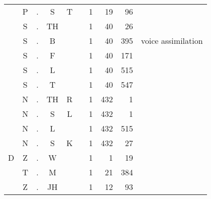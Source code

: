 \begin{center}
\begin{longtable}{c@{ } c@{ } c@{ } c@{ } c@{ } c@{ } r r r l }
  & P  & . & S  & T &   & 1 & 19 & 96 &  \\ 
  & S  & . & TH &   &   & 1 & 40 & 26 &  \\ 
  & S  & . & B  &   &   & 1 & 40 & 395 & voice assimilation \\
  & S  & . & F  &   &   & 1 & 40 & 171 &  \\ 
  & S  & . & L  &   &   & 1 & 40 & 515 &  \\ 
  & S  & . & T  &   &   & 1 & 40 & 547 &  \\ 
  & N  & . & TH & R &   & 1 & 432 & 1 &  \\ 
  & N  & . & S  & L &   & 1 & 432 & 1 &  \\ 
  & N  & . & L  &   &   & 1 & 432 & 515 &  \\ 
  & N  & . & S  & K &   & 1 & 432 & 27 &  \\ 
D & Z  & . & W  &   &   & 1 & 1 & 19 &  \\ 
  & T  & . & M  &   &   & 1 & 21 & 384 &  \\ 
  & Z  & . & JH &   &   & 1 & 12 & 93 &  \\ 
\bottomrule
\end{longtable}
\end{center}
